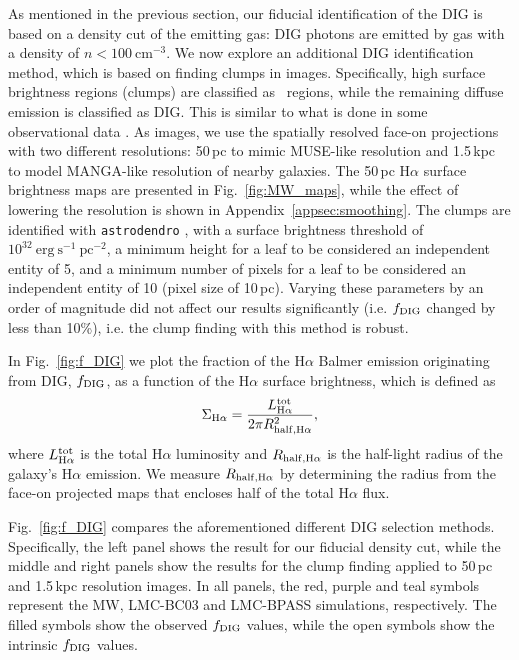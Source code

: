 \documentclass[fleqn,usenatbib]{mnras}
\newcommand\HII{\ion{H}{II}~} %
\begin{document}
As mentioned in the previous section, our fiducial identification of the DIG is based on a density cut of the emitting gas: DIG photons are emitted by gas with a density of $n<100~\mathrm{cm}^{-3}$. We now explore an additional DIG identification method, which is based on finding clumps in images. Specifically, high surface brightness regions (clumps) are classified as \HII regions, while the remaining diffuse emission is classified as DIG. This is similar to what is done in some observational data \citep[e.g.,][]{thilker00, oey07, barnes21}. As images, we use the spatially resolved face-on projections with two different resolutions: 50\,pc to mimic MUSE-like resolution and 1.5\,kpc to model MANGA-like resolution of nearby galaxies. The 50\,pc H$\alpha$ surface brightness maps are presented in Fig.~\ref{fig:MW_maps}, while the effect of lowering the resolution is shown in Appendix~\ref{appsec:smoothing}. The clumps are identified with \texttt{astrodendro} \citep{robitaille19}, with a surface brightness threshold of $10^{32}~\mathrm{erg}~\mathrm{s}^{-1}~\mathrm{pc}^{-2}$, a minimum height for a leaf to be considered an independent entity of 5, and a minimum number of pixels for a leaf to be considered an independent entity of 10 (pixel size of 10\,pc). Varying these parameters by an order of magnitude did not affect our results significantly (i.e. $f_{\rm DIG}$ changed by less than 10\%), i.e. the clump finding with this method is robust.  

In Fig.~\ref{fig:f_DIG} we plot the fraction of the H$\alpha$ Balmer emission originating from DIG, $f_{\rm DIG}$, as a function of the H$\alpha$ surface brightness, which is defined as
\begin{equation}
    \Sigma_{\rm H\alpha}=\frac{L_{\rm H\alpha}^{\rm tot}}{2 \pi R^2_{\rm half,H\alpha}},
\label{eq:SHa}
\end{equation}
where $L_{\rm H\alpha}^{\rm tot}$ is the total H$\alpha$ luminosity and $R_{\rm half,H\alpha}$ is the half-light radius of the galaxy's H$\alpha$ emission. We measure $R_{\rm half,H\alpha}$ by determining the radius from the face-on projected maps that encloses half of the total H$\alpha$ flux.

Fig.~\ref{fig:f_DIG} compares the aforementioned different DIG selection methods. Specifically, the left panel shows the result for our fiducial density cut, while the middle and right panels show the results for the clump finding applied to 50\,pc and 1.5\,kpc resolution images. In all panels, the red, purple and teal symbols represent the MW, LMC-BC03 and LMC-BPASS simulations, respectively. The filled symbols show the observed $f_{\rm DIG}$ values, while the open symbols show the intrinsic $f_{\rm DIG}$ values.
\end{document}

